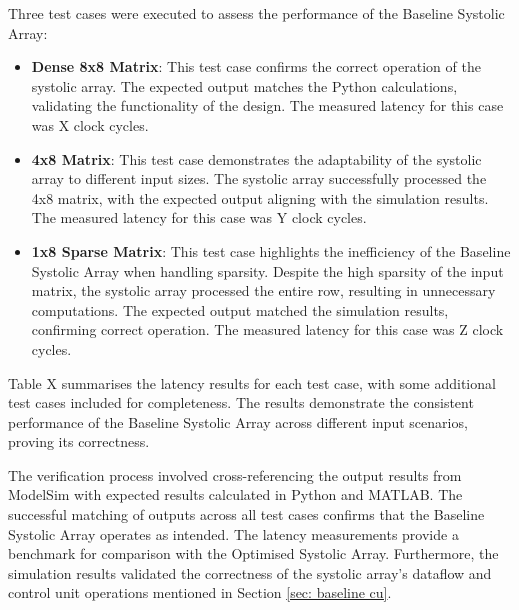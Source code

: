 \documentclass[12pt, a4paper, ukenglish]{article}
\begin{document}
    Three test cases were executed to assess the performance of the Baseline Systolic Array:
    \begin{itemize}
        \item \textbf{Dense 8x8 Matrix}: This test case confirms the correct operation of the systolic array. The expected output matches the Python calculations, validating the functionality of the design. The measured latency for this case was X clock cycles.
        
        \item \textbf{4x8 Matrix}: This test case demonstrates the adaptability of the systolic array to different input sizes. The systolic array successfully processed the 4x8 matrix, with the expected output aligning with the simulation results. The measured latency for this case was Y clock cycles.
        
        \item \textbf{1x8 Sparse Matrix}: This test case highlights the inefficiency of the Baseline Systolic Array when handling sparsity. Despite the high sparsity of the input matrix, the systolic array processed the entire row, resulting in unnecessary computations. The expected output matched the simulation results, confirming correct operation. The measured latency for this case was Z clock cycles.

    \end{itemize}

    Table X summarises the latency results for each test case, with some additional test cases included for completeness. The results demonstrate the consistent performance of the Baseline Systolic Array across different input scenarios, proving its correctness.

    The verification process involved cross-referencing the output results from ModelSim with expected results calculated in Python and MATLAB. The successful matching of outputs across all test cases confirms that the Baseline Systolic Array operates as intended. The latency measurements provide a benchmark for comparison with the Optimised Systolic Array. Furthermore, the simulation results validated the correctness of the systolic array's dataflow and control unit operations mentioned in Section \ref{sec: baseline cu}.
\end{document}
